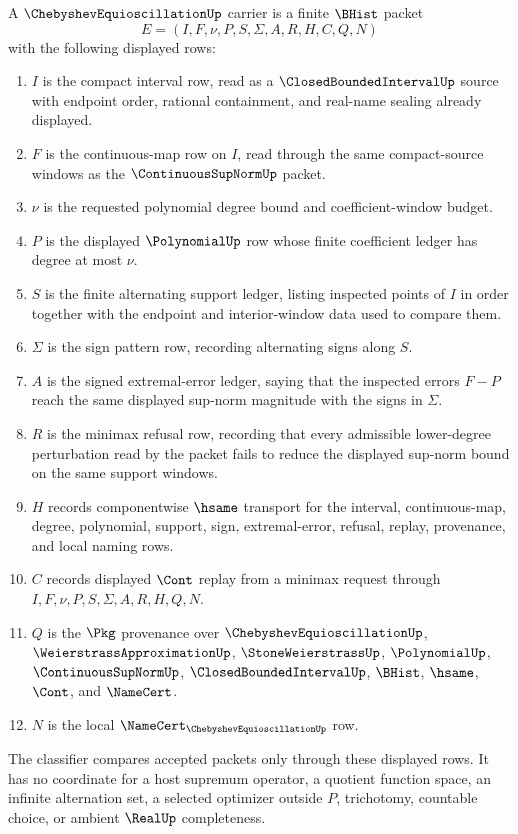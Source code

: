 \begin{definition}
\label{def:chebyshev-equioscillation-carrier}
A $\ChebyshevEquioscillationUp$ carrier is a finite $\BHist$ packet
$$
E=(I,F,\nu,P,S,\Sigma,A,R,H,C,Q,N)
$$
with the following displayed rows:
\begin{enumerate}
\item $I$ is the compact interval row, read as a $\ClosedBoundedIntervalUp$ source with endpoint order, rational containment, and real-name sealing already displayed.
\item $F$ is the continuous-map row on $I$, read through the same compact-source windows as the $\ContinuousSupNormUp$ packet.
\item $\nu$ is the requested polynomial degree bound and coefficient-window budget.
\item $P$ is the displayed $\PolynomialUp$ row whose finite coefficient ledger has degree at most $\nu$.
\item $S$ is the finite alternating support ledger, listing inspected points of $I$ in order together with the endpoint and interior-window data used to compare them.
\item $\Sigma$ is the sign pattern row, recording alternating signs along $S$.
\item $A$ is the signed extremal-error ledger, saying that the inspected errors $F-P$ reach the same displayed sup-norm magnitude with the signs in $\Sigma$.
\item $R$ is the minimax refusal row, recording that every admissible lower-degree perturbation read by the packet fails to reduce the displayed sup-norm bound on the same support windows.
\item $H$ records componentwise $\hsame$ transport for the interval, continuous-map, degree, polynomial, support, sign, extremal-error, refusal, replay, provenance, and local naming rows.
\item $C$ records displayed $\Cont$ replay from a minimax request through $I,F,\nu,P,S,\Sigma,A,R,H,Q,N$.
\item $Q$ is the $\Pkg$ provenance over $\ChebyshevEquioscillationUp$, $\WeierstrassApproximationUp$, $\StoneWeierstrassUp$, $\PolynomialUp$, $\ContinuousSupNormUp$, $\ClosedBoundedIntervalUp$, $\BHist$, $\hsame$, $\Cont$, and $\NameCert$.
\item $N$ is the local $\NameCert_{\ChebyshevEquioscillationUp}$ row.
\end{enumerate}
The classifier compares accepted packets only through these displayed rows. It has no coordinate for a host supremum operator, a quotient function space, an infinite alternation set, a selected optimizer outside $P$, trichotomy, countable choice, or ambient $\RealUp$ completeness.
\end{definition}

